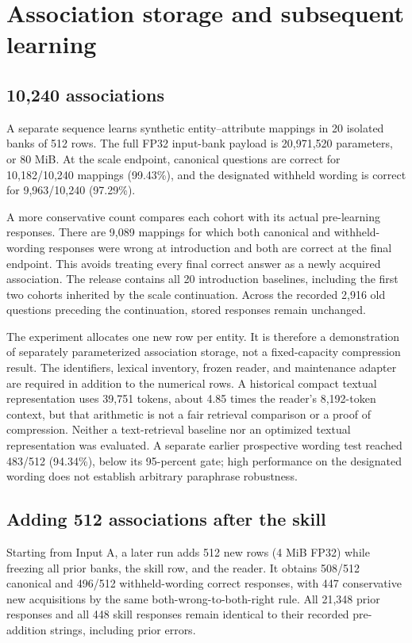 \documentclass[11pt]{article}
\begin{document}
\section{Association storage and subsequent learning}
\subsection{10,240 associations}
A separate sequence learns synthetic entity--attribute mappings in 20 isolated banks of 512 rows. The full FP32 input-bank payload is 20,971,520 parameters, or 80 MiB. At the scale endpoint, canonical questions are correct for 10,182/10,240 mappings (99.43\%), and the designated withheld wording is correct for 9,963/10,240 (97.29\%).

A more conservative count compares each cohort with its actual pre-learning responses. There are 9,089 mappings for which both canonical and withheld-wording responses were wrong at introduction and both are correct at the final endpoint. This avoids treating every final correct answer as a newly acquired association. The release contains all 20 introduction baselines, including the first two cohorts inherited by the scale continuation. Across the recorded 2,916 old questions preceding the continuation, stored responses remain unchanged.

The experiment allocates one new row per entity. It is therefore a demonstration of separately parameterized association storage, not a fixed-capacity compression result. The identifiers, lexical inventory, frozen reader, and maintenance adapter are required in addition to the numerical rows. A historical compact textual representation uses 39,751 tokens, about 4.85 times the reader's 8,192-token context, but that arithmetic is not a fair retrieval comparison or a proof of compression. Neither a text-retrieval baseline nor an optimized textual representation was evaluated. A separate earlier prospective wording test reached 483/512 (94.34\%), below its 95-percent gate; high performance on the designated wording does not establish arbitrary paraphrase robustness.

\subsection{Adding 512 associations after the skill}
Starting from Input A, a later run adds 512 new rows (4 MiB FP32) while freezing all prior banks, the skill row, and the reader. It obtains 508/512 canonical and 496/512 withheld-wording correct responses, with 447 conservative new acquisitions by the same both-wrong-to-both-right rule. All 21,348 prior responses and all 448 skill responses remain identical to their recorded pre-addition strings, including prior errors.
\end{document}
